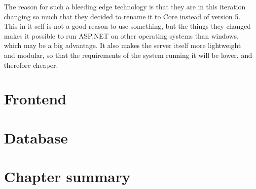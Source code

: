 The reason for such a bleeding edge technology is that they are in this iteration changing so much that they decided to rename it to Core instead of version 5. This in it self is not a good reason to use something, but the things they changed makes it possible to run ASP.NET on other operating systems than windows\cite{asp5:intro}, which may be a big advantage. It also makes the server itself more lightweight and modular, so that the requirements of the system running it will be lower, and therefore cheaper.

\section{Frontend}
\label{sec:Frontend}


\section{Database }
\label{sec:Database}


\section{Chapter summary }
